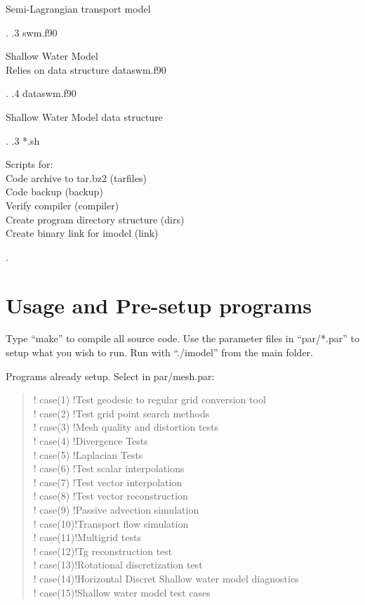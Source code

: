 \documentclass[a4paper,10pt]{article}
\begin{document}
{\begin{minipage}[t]{10cm}
	    Semi-Lagrangian transport model\\
          \end{minipage}.
.3 swm{.}f90 \hspace{1cm}  \begin{minipage}[t]{10cm}
	    Shallow Water Model\\
	    Relies on data structure dataswm{.}f90
	    \end{minipage}.
.4 dataswm{.}f90 \hspace{1cm}  \begin{minipage}[t]{10cm}
	    Shallow Water Model data structure\\
          \end{minipage}.
.3 *{.}sh \hspace{1cm}  \begin{minipage}[t]{10cm}
	    Scripts for: \\
	    Code archive to tar.bz2 (tarfiles)\\
	    Code backup (backup)\\
	    Verify compiler (compiler) \\
	    Create program directory structure (dirs) \\
	    Create binary link for imodel (link) \\
          \end{minipage}.
}
 
\section{Usage and Pre-setup programs}

Type ``make'' to compile all source code. Use the parameter files in ``par/*.par'' to setup what you wish to run. Run with ``./imodel'' from the main folder.

Programs already setup. Select in par/mesh.par:\\
\begin{verse}
!  case(1) !Test geodesic to regular grid conversion tool\\
!  case(2) !Test grid point search methods\\
!  case(3) !Mesh quality and distortion tests\\
!  case(4) !Divergence Tests\\
!  case(5) !Laplacian Tests\\
!  case(6) !Test scalar interpolations\\
!  case(7) !Test vector interpolation\\
!  case(8) !Test vector reconstruction\\
!  case(9) !Passive advection simulation\\
!  case(10)!Transport flow simulation\\
!  case(11)!Multigrid tests\\
!  case(12)!Tg reconstruction test\\
!  case(13)!Rotational discretization test\\
!  case(14)!Horizontal Discret Shallow water model diagnostics\\
!  case(15)!Shallow water model test cases\\
\end{verse}
\end{document}
